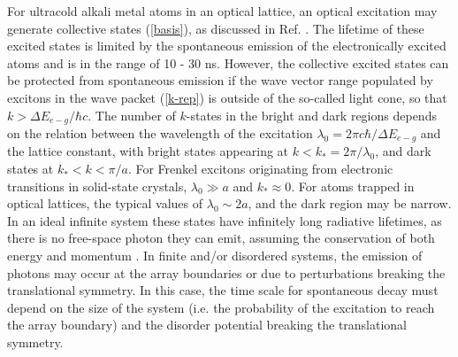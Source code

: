 For ultracold alkali metal atoms in an optical lattice, an optical excitation may generate collective states (\ref{basis}),
as discussed in Ref. \cite{electronic-exciton1, electronic-exciton2}.
The lifetime of these excited states is limited by the spontaneous emission of the electronically excited atoms and is
in the range of 10 - 30 ns.
However, the collective excited states can be protected from spontaneous emission if the wave vector range populated by excitons in the wave packet (\ref{k-rep}) is
outside of the so-called light cone, so that $k >\Delta E_{e-g}/\hbar c$.  
The number of $k$-states in the bright and dark regions depends on the relation between the wavelength of the 
excitation $\lambda_0 = 2\pi c \hbar / \Delta E_{e-g} $ and the lattice constant, with bright states appearing at $k < k_* = 2\pi / \lambda_0$, and dark
states at $k_* < k < \pi/a$. For Frenkel excitons originating from electronic transitions in solid-state crystals, $\lambda_0 \gg a$ and $k_*
\approx 0$. For atoms trapped in optical lattices, the typical values of $\lambda_0 \sim 2a$, and the dark region may be narrow. 
 In an ideal infinite system these states have infinitely long radiative lifetimes, as there is no free-space 
photon they can emit, assuming the conservation of both energy and momentum \cite{electronic-exciton1, 
electronic-exciton2, agranovich1966, agranovich}.
In finite and/or disordered systems, the emission of photons may occur at the array boundaries or due to perturbations 
breaking the translational symmetry. In this case, the time scale for spontaneous decay must depend on 
the size of the system (i.e. the probability of the excitation to reach the array boundary) and the disorder potential 
breaking the translational symmetry.  

